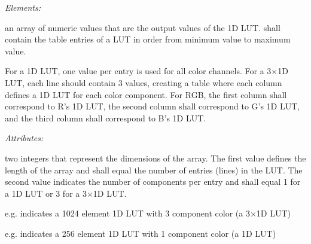 \emph{Elements:}
\begin{xmlfields}
    \xmlitem[Array][required] an array of numeric values that are the output values of the 1D LUT.   shall contain the table entries of a LUT in order from minimum value to maximum value. 
    
    For a 1D LUT, one value per entry is used for all color channels. For a 3$\times$1D LUT, each line should contain 3 values, creating a table where each column defines a 1D LUT for each color component. For RGB, the first column shall correspond to R's 1D LUT, the second column shall correspond to G's 1D LUT, and the third column shall correspond to B's 1D LUT. 

    \emph{Attributes:}
    \begin{xmlfields}
    	\xmlitem[dim][required] 
    	two integers that represent the dimensions of the array. The first value defines the length of the array and shall equal the number of entries (lines) in the LUT. The second value indicates the number of components per entry and shall equal 1 for a 1D LUT or 3 for a 3$\times$1D LUT. 
        
        \begin{list}{}{\setlength{\itemsep}{4pt}\setlength{\topsep}{0pt}}
			\item e.g.  indicates a 1024 element 1D LUT with 3 component color (a 3$\times$1D LUT)
			\item e.g.  indicates a 256 element 1D LUT with 1 component color (a 1D LUT)		
		\end{list}
	\end{xmlfields}

    
\end{xmlfields}


